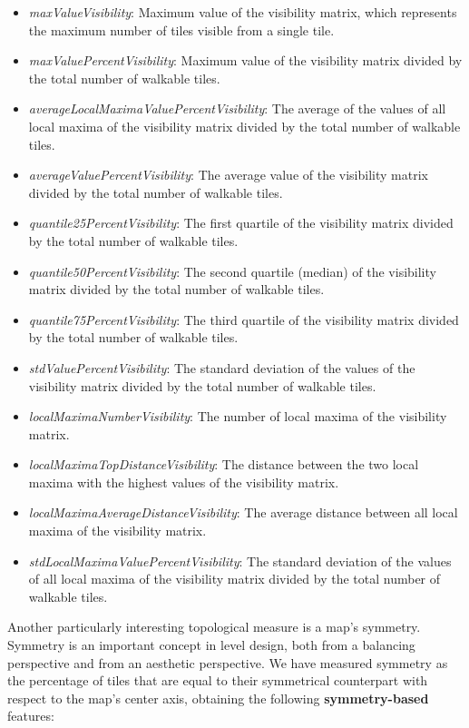 \begin{itemize}
    \item \textit{maxValueVisibility}: Maximum value of the visibility matrix, which represents the maximum number of tiles visible from a single tile.
    \item \textit{maxValuePercentVisibility}: Maximum value of the visibility matrix divided by the total number of walkable tiles.
    \item \textit{averageLocalMaximaValuePercentVisibility}: The average of the values of all local maxima of the visibility matrix divided by the total number of walkable tiles.
    \item \textit{averageValuePercentVisibility}: The average value of the visibility matrix divided by the total number of walkable tiles.
    \item \textit{quantile25PercentVisibility}: The first quartile of the visibility matrix divided by the total number of walkable tiles.
    \item \textit{quantile50PercentVisibility}: The second quartile (median) of the visibility matrix divided by the total number of walkable tiles.
    \item \textit{quantile75PercentVisibility}: The third quartile of the visibility matrix divided by the total number of walkable tiles.
    \item \textit{stdValuePercentVisibility}: The standard deviation of the values of the visibility matrix divided by the total number of walkable tiles.
    \item \textit{localMaximaNumberVisibility}: The number of local maxima of the visibility matrix.
    \item \textit{localMaximaTopDistanceVisibility}: The distance between the two local maxima with the highest values of the visibility matrix.
    \item \textit{localMaximaAverageDistanceVisibility}: The average distance between all local maxima of the visibility matrix.
    \item \textit{stdLocalMaximaValuePercentVisibility}: The standard deviation of the values of all local maxima of the visibility matrix divided by the total number of walkable tiles.
\end{itemize}

Another particularly interesting topological measure is a map's symmetry. Symmetry is an important concept in level design, both from a balancing perspective and from an aesthetic perspective. We have measured symmetry as the percentage of tiles that are equal to their symmetrical counterpart with respect to the map's center axis, obtaining the following \textbf{symmetry-based} features:

